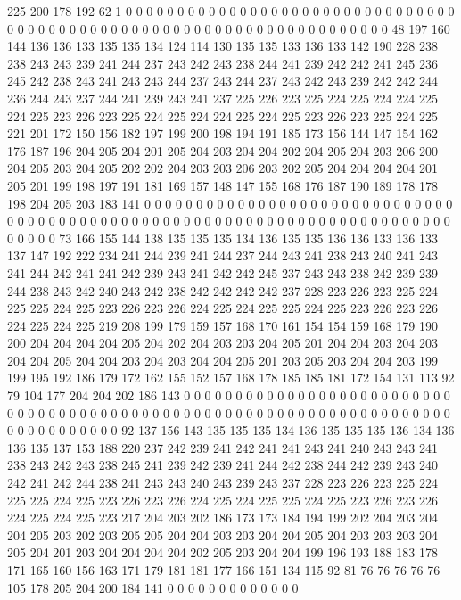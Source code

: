 225 200 178 192 62 1 0 0 0 0 0 0 0 0 0 0 0 0 0 0
0 0 0 0 0 0 0 0 0 0 0 0 0 0 0 0 0 0 0 0
0 0 0 0 0 0 0 0 0 0 0 0 0 0 0 0 0 0 0 0
0 0 0 0 0 0 0 0 0 0 0 0 0 0 0 48 197 160 144 136
136 133 135 135 134 124 114 130 135 135 133 136 133 142 190 228 238 238 243 243
239 241 244 237 243 242 243 238 244 241 239 242 242 241 245 236 245 242 238 243
241 243 243 244 237 243 244 237 243 242 243 239 242 242 244 236 244 243 237 244
241 239 243 241 237 225 226 223 225 224 225 224 224 225 224 225 223 226 223 225
224 225 224 224 225 224 225 223 226 223 225 224 225 221 201 172 150 156 182 197
199 200 198 194 191 185 173 156 144 147 154 162 176 187 196 204 205 204 201 205
204 203 204 204 202 204 205 204 203 206 200 204 205 203 204 205 202 202 204 203
203 206 203 202 205 204 204 204 204 201 205 201 199 198 197 191 181 169 157 148
147 155 168 176 187 190 189 178 178 198 204 205 203 183 141 0 0 0 0 0
0 0 0 0 0 0 0 0 0 0 0 0 0 0 0 0 0 0 0 0
0 0 0 0 0 0 0 0 0 0 0 0 0 0 0 0 0 0 0 0
0 0 0 0 0 0 0 0 0 0 0 0 0 0 0 0 0 0 0 0
0 0 0 0 0 0 0 0 0 0 0 0 0 73 166 155 144 138 135 135
135 134 136 135 135 136 136 133 136 133 137 147 192 222 234 241 244 239 241 244
237 244 243 241 238 243 240 241 243 241 244 242 241 241 242 239 243 241 242 242
245 237 243 243 238 242 239 239 244 238 243 242 240 243 242 238 242 242 242 242
237 228 223 226 223 225 224 225 225 224 225 223 226 223 226 224 225 224 225 225
224 225 223 226 223 226 224 225 224 225 219 208 199 179 159 157 168 170 161 154
154 159 168 179 190 200 204 204 204 204 205 204 202 204 203 203 204 205 201 204
204 203 204 203 204 204 205 204 204 203 204 203 204 204 205 201 203 205 203 204
204 203 199 199 195 192 186 179 172 162 155 152 157 168 178 185 185 181 172 154
131 113 92 79 104 177 204 204 202 186 143 0 0 0 0 0 0 0 0 0
0 0 0 0 0 0 0 0 0 0 0 0 0 0 0 0 0 0 0 0
0 0 0 0 0 0 0 0 0 0 0 0 0 0 0 0 0 0 0 0
0 0 0 0 0 0 0 0 0 0 0 0 0 0 0 0 0 0 0 0
0 0 0 0 0 0 0 0 0 0 0 92 137 156 143 135 135 135 134 136
135 135 135 136 134 136 136 135 137 153 188 220 237 242 239 241 242 241 241 243
241 240 243 243 241 238 243 242 243 238 245 241 239 242 239 241 244 242 238 244
242 239 243 240 242 241 242 244 238 241 243 243 240 243 239 243 237 228 223 226
223 225 224 225 225 224 225 223 226 223 226 224 225 224 225 225 224 225 223 226
223 226 224 225 224 225 223 217 204 203 202 186 173 173 184 194 199 202 204 203
204 204 205 203 202 203 205 205 204 204 203 203 204 204 205 204 203 203 203 204
205 204 201 203 204 204 204 204 202 205 203 204 204 199 196 193 188 183 178 171
165 160 156 163 171 179 181 181 177 166 151 134 115 92 81 76 76 76 76 76
105 178 205 204 200 184 141 0 0 0 0 0 0 0 0 0 0 0 0 0
